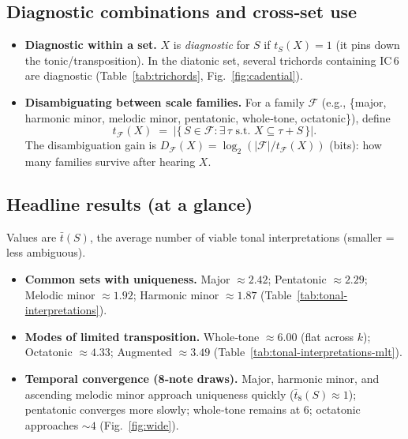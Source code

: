 \documentclass[10pt,twocolumn]{article}
\numberwithin{equation}{section} %
\begin{document}
    \subsection*{Diagnostic combinations and cross‑set use}
    \begin{itemize}
        \item \textbf{Diagnostic within a set.} $X$ is \emph{diagnostic} for $S$ if $t_S(X)=1$ (it pins down the tonic/transposition). In the diatonic set, several trichords containing IC\,6 are diagnostic (Table~\ref{tab:trichords}, Fig.~\ref{fig:cadential}).
        \item \textbf{Disambiguating between scale families.} For a family $\mathcal{F}$ (e.g., \{major, harmonic minor, melodic minor, pentatonic, whole‑tone, octatonic\}), define
        \[
            t_{\mathcal{F}}(X) \;=\; \bigl|\{\,S\in\mathcal{F}:\exists\,\tau \text{ s.t. } X\subseteq \tau{+}S\,\}\bigr|.
        \]
        The disambiguation gain is $D_{\mathcal{F}}(X)=\log_2(|\mathcal{F}|/t_{\mathcal{F}}(X))$ (bits): how many families survive after hearing $X$.
    \end{itemize}

    \subsection*{Headline results (at a glance)}
    Values are $\bar{t}(S)$, the average number of viable tonal interpretations (smaller = less ambiguous).
    \begin{itemize}
        \item \textbf{Common sets with uniqueness.} Major $\approx 2.42$; Pentatonic $\approx 2.29$; Melodic minor $\approx 1.92$; Harmonic minor $\approx 1.87$ (Table~\ref{tab:tonal-interpretations}).
        \item \textbf{Modes of limited transposition.} Whole‑tone $\approx 6.00$ (flat across $k$); Octatonic $\approx 4.33$; Augmented $\approx 3.49$ (Table~\ref{tab:tonal-interpretations-mlt}).
        \item \textbf{Temporal convergence (8‑note draws).} Major, harmonic minor, and ascending melodic minor approach uniqueness quickly ($\bar{t}_8(S)\!\approx\!1$); pentatonic converges more slowly; whole‑tone remains at $6$; octatonic approaches $\sim 4$ (Fig.~\ref{fig:wide}).
    \end{itemize}
\end{document}
